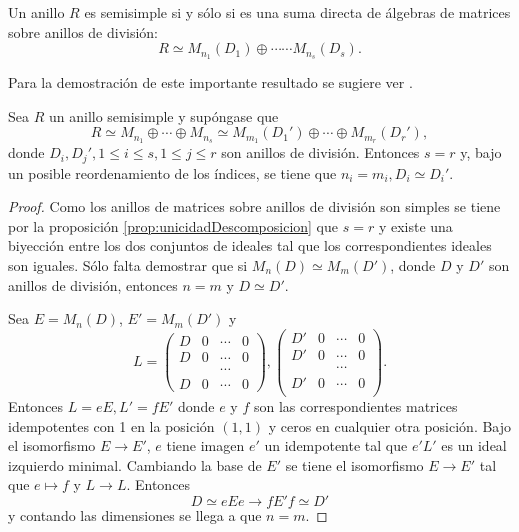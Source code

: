 \begin{teorema}
Un anillo $R$ es semisimple si y sólo si es una suma directa de álgebras de matrices sobre anillos de división:
\[ R \simeq M_{n_1}(D_1)\oplus \cdots \cdots M_{n_s}(D_s).  \]
\end{teorema}
Para la demostración de este importante resultado se sugiere ver \cite[página 200]{bib:AlgebraPostGrado}.
\begin{teorema}
Sea $R$ un anillo semisimple y supóngase que 
\[ R \simeq M_{n_1} \oplus \cdots \oplus M_{n_s} \simeq M_{m_1}(D_1')\oplus \cdots \oplus M_{m_r}(D_r'), \] donde $D_i, D_j', 1 \leq i \leq s, 1 \leq j \leq r$ son anillos de división. Entonces $s = r$ y, bajo un posible reordenamiento de los índices, se tiene que $n_i = m_i, D_i \simeq D_i'$. 
\end{teorema} 
\begin{proof}
Como los anillos de matrices sobre anillos de división son simples se tiene por la proposición \ref{prop:unicidadDescomposicion} que $s = r$ y existe una biyección entre los dos conjuntos de ideales tal que los correspondientes ideales son iguales. Sólo falta demostrar que si $M_n(D)\simeq M_m(D')$, donde $D$ y $D'$ son anillos de división, entonces $n = m$ y $D \simeq D'$.

Sea $E = M_n(D)$, $E' = M_m(D')$ y 
\[ L = \begin{pmatrix} 
D &  0 & \cdots & 0 \\
D &  0 & \cdots & 0 \\
 & & \cdots & \\
 D &  0 & \cdots & 0
\end{pmatrix} , \begin{pmatrix}
D' & 0 & \cdots & 0\\
D' & 0 & \cdots & 0\\
 & & \cdots & \\
D' & 0 & \cdots & 0\\
\end{pmatrix}.\]
Entonces $L = eE, L'= fE'$ donde $e$ y $f$ son las correspondientes matrices idempotentes con 1 en la posición $(1,1)$ y ceros en cualquier otra posición. Bajo el isomorfismo $E \to E'$, $e$ tiene imagen $e'$ un idempotente tal que $e'L'$ es un ideal izquierdo minimal. Cambiando la base de $E'$ se tiene el isomorfismo $E \to E'$ tal que $e \mapsto f$ y $L \to L$. Entonces \[ D \simeq eEe \to fE'f \simeq D' \] y contando las dimensiones se llega a que $n = m$.  
\end{proof}
